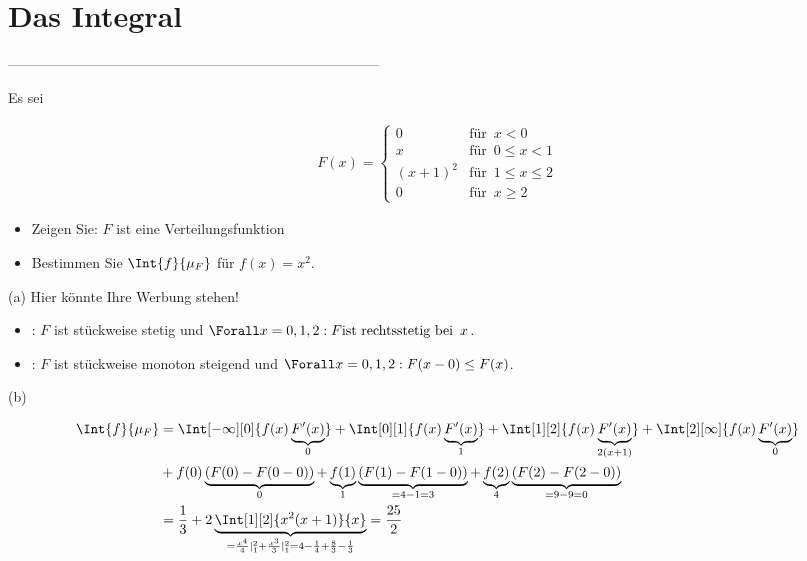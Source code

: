 \setcounter{exercise}{0}

\section{Das Integral}

--------------------------------------------------------------------------------

\begin{exercise}

Es sei

\begin{align*}
  F(x) =
  \begin{cases}
    0         & \text{für} \enspace x < 0 \\
    x         & \text{für} \enspace 0 \leq x < 1 \\
    (x + 1)^2 & \text{für} \enspace 1 \leq x \leq 2 \\
    0         & \text{für} \enspace x \geq 2
  \end{cases}
\end{align*}

\begin{itemize}
  \item[(a)] Zeigen Sie: $F$ ist eine Verteilungsfunktion
  \item[(b)] Bestimmen Sie $\Int{f}{\mu_F}$ für $f(x) = x^2$.
\end{itemize}

\end{exercise}

\begin{solution}

(a) Hier könnte Ihre Werbung stehen!

\begin{itemize}

  \item {}: $F$ ist stückweise stetig und $\Forall x = 0, 1, 2: F \text{ist rechtsstetig bei} \enspace x$.

  \item {}: $F$ ist stückweise monoton steigend und $\Forall x = 0, 1, 2: F(x - 0) \leq F(x)$.

\end{itemize}

(b)

\begin{align*}
  \Int{f}{\mu_F}
  & =
  \Int[-\infty][0]{f(x) \underbrace{F^\prime(x)}_0}
  +
  \Int[0][1]{f(x) \underbrace{F^\prime(x)}_1}
  +
  \Int[1][2]{f(x) \underbrace{F^\prime(x)}_{2 (x+1)}}
  +
  \Int[2][\infty]{f(x) \underbrace{F^\prime(x)}_0} \\
  & +
  f(0) \underbrace{(F(0) - F(0 - 0))}_0
  +
  \underbrace{f(1)}_1 \underbrace{(F(1) - F(1 - 0))}_{= 4-1 = 3}
  +
  \underbrace{f(2)}_4 \underbrace{(F(2) - F(2 - 0))}_{= 9-9 = 0} \\
  & =
  \frac{1}{3}
  +
  2 \underbrace
  {
    \Int[1][2]{x^2 (x + 1)}{x}
  }_{
    = \frac{x^4}{4} |_1^2 + \frac{x^3}{3} |_1^2
    = 4 - \frac{1}{4} + \frac{8}{3} - \frac{1}{3}
  }
  =
  \frac{25}{2}
\end{align*}

\end{solution}

